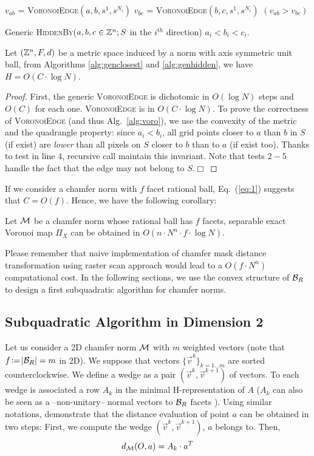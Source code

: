 \documentclass{llncs}
\begin{document}
\begin{algorithm}[H]\footnotesize
  $v_{ab}$ = \textsc{VoronoiEdge}$(a,b,s^1, s^{N_i})$\;
  $v_{bc}$ = \textsc{VoronoiEdge}$(b,c,s^1, s^{N_i})$\;
  \Return $(v_{ab}> v_{bc})$\;
  \caption{\footnotesize Generic \textsc{HiddenBy}($a,b,c\in{\mathbb{Z}}^n; S$ in the $i^{th}$
    direction) $a_i<b_i<c_i$.\label{alg:genhidden}}
\end{algorithm}
\begin{lemma}
\label{lem:genericDich}
   Let $({\mathbb{Z}}^n, F, d)$ be a metric space induced by a norm with axis
   symmetric unit ball,   from Algorithms \ref{alg:genclosest} and
   \ref{alg:genhidden}, we have $H=O(C\cdot \log{N})$.
\end{lemma}
\begin{proof}
  First, the generic \textsc{VoronoiEdge} is dichotomic in
  $O(\log{N})$ steps and $O(C)$ for each one. \textsc{VoronoiEdge} is
  in $O(C\cdot\log{N})$.  To prove the correctness of
  \textsc{VoronoiEdge} (and thus Alg.~\ref{alg:voro}), we use the
  convexity of the metric and the quadrangle property: since
  $a_i<b_i$, all grid points closer to $a$ than $b$ in $S$ (if exist)
  are \emph{lower} than all pixels on $S$ closer to $b$ than to $a$
  (if exist too). Thanks to test in line $4$, recursive call maintain
  this invariant. Note that tests $2-5$ handle the fact that the edge
  may not belong to $S$.$\Box$
\end{proof}
If we consider a chamfer norm with $f$ facet rational ball, Eq.~(\ref{eq:1})
suggests that $C=O(f)$. Hence, we have the following corollary:
\begin{corollary}
  Let $\mathcal{M}$ be a chamfer norm whose rational ball has $f$ facets,
  separable exact Voronoi map $\Pi_X$ can be obtained in
    $O(n\cdot N^n\cdot f \cdot \log{N})$.
\end{corollary}
Please remember that naive implementation of chamfer mask distance
transformation using raster scan approach would lead to a $O(f\cdot
N^n)$ computational cost. In the following sections, we use the convex
structure of $\mathcal{B}_R$ to design a first subquadratic algorithm for chamfer
norms.

\subsection{Subquadratic Algorithm in Dimension 2}
\label{sec:subq-algor-dimens}

Let us consider a 2D chamfer norm $\mathcal{M}$ with $m$ weighted vectors (note
that $f\!\mathrel{\mathop:}=\!|\mathcal{B}_R| = m$ in 2D). We suppose that vectors
$\{\vec{v}^k\}_{k=1\ldots m}$ are sorted counterclockwise. We define a wedge
as a pair $(\vec{v}^k,\vec{v}^{k+1})$ of vectors. To each wedge is
associated a row $A_k$ in the minimal H-representation of $A$ ($A_k$
can also be seen as a  --non-unitary-- normal vectors to $\mathcal{B}_R$ facets
\cite{DBLP:journals/pr/NormandE09}). Using similar notations,
\cite{Thiel_hdr,Strand2008} demonstrate that the distance evaluation
of point $a$ can be obtained in two steps: First, we compute the wedge
$(\vec{v}^k,\vec{v}^{k+1})$, $a$ belongs to. Then,
\begin{equation}
\label{eq:2}
  d_{\mathcal{M}}(O,a) = A_k\cdot a^T
\end{equation}
\end{document}
